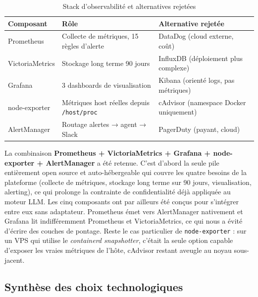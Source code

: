         \begin{table}[H]
        \centering
        \begin{tabular}{|m{3cm}|m{4cm}|m{5cm}|}
        \hline
        \textbf{Composant} & \textbf{Rôle} & \textbf{Alternative rejetée} \\
        \hline
        Prometheus \cite{Prometheus} & Collecte de métriques, 15 règles d'alerte & DataDog (cloud externe, coût) \\
        \hline
        VictoriaMetrics \cite{VictoriaMetrics} & Stockage long terme 90 jours & InfluxDB (déploiement plus complexe) \\
        \hline
        Grafana \cite{Grafana} & 3 dashboards de visualisation & Kibana (orienté logs, pas métriques) \\
        \hline
        node-exporter \cite{NodeExporter} & Métriques host réelles depuis \texttt{/host/proc} & cAdvisor (namespace Docker uniquement) \\
        \hline
        AlertManager \cite{AlertManager} & Routage alertes → agent → Slack & PagerDuty (payant, cloud) \\
        \hline
        \end{tabular}
        \caption{Stack d'observabilité et alternatives rejetées}
        \label{tab:obs_stack}
        \end{table}

        La combinaison \textbf{Prometheus + VictoriaMetrics + Grafana + node-exporter +
        AlertManager} a été retenue. C'est d'abord la seule pile entièrement open source
        et auto-hébergeable qui couvre les quatre besoins de la plateforme (collecte de
        métriques, stockage long terme sur 90 jours, visualisation, alerting), ce qui
        prolonge la contrainte de confidentialité déjà appliquée au moteur LLM. Les cinq composants ont par
        ailleurs été conçus pour s'intégrer entre eux sans adaptateur. Prometheus émet
        vers AlertManager nativement et Grafana lit indifféremment Prometheus et
        VictoriaMetrics, ce qui nous a évité d'écrire des couches de pontage. Reste le
        cas particulier de \texttt{node-exporter} \cite{NodeExporter} : sur un VPS qui
        utilise le \textit{containerd snapshotter}, c'était la seule option capable
        d'exposer les vraies métriques de l'hôte, cAdvisor \cite{cAdvisor} restant
        aveugle au noyau sous-jacent.

    \subsection{Synthèse des choix technologiques}

